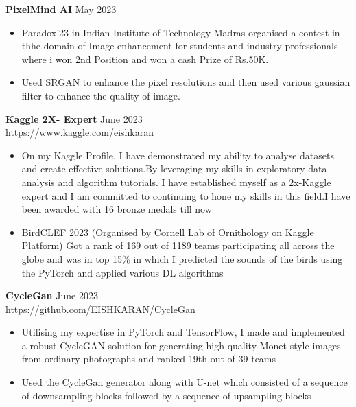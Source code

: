 \documentclass[a4paper]{article}
\begin{document}
{\textbf{PixelMind AI}} \hfill May 2023 \\
\vspace{-1.5mm}
\begin{itemize} 
	\item Paradox’23 in Indian Institute of Technology Madras organised a contest in thhe domain of Image enhancement for students and industry professionals where i won 2nd Position and won a cash Prize of Rs.50K.
    \vspace{-2mm}
    \item Used SRGAN to enhance the pixel resolutions and then used various gaussian filter to enhance the quality of image.
\end{itemize}
{\textbf{Kaggle 2X- Expert}} \hfill June 2023 \\
\vspace{-1mm}
\url{https://www.kaggle.com/eishkaran} \\
\vspace{-2mm}
\begin{itemize} 
	\item On my Kaggle Profile, I have demonstrated my ability to analyse datasets and create effective solutions.By leveraging my skills in exploratory data analysis and algorithm tutorials. I have established myself as a 2x-Kaggle expert and I am committed to continuing to hone my skills in this field.I have been awarded with 16 bronze medals till now
    \vspace{-2mm}
    \item BirdCLEF 2023 (Organised by Cornell Lab of Ornithology on Kaggle Platform) Got a rank of 169 out of 1189 teams participating all across the globe and was in top 15\%  in which I predicted the sounds of the birds using the PyTorch and applied various DL algorithms 

    
\end{itemize}
{\textbf{CycleGan }} \hfill June 2023\\
\vspace{-1mm}
\url{https://github.com/EISHKARAN/CycleGan} \\
\vspace{-2mm}
\begin{itemize} 
    \item Utilising my expertise in PyTorch and TensorFlow, I made and implemented a robust CycleGAN solution for generating high-quality Monet-style images from ordinary photographs and ranked 19th out of 39 teams
    \vspace{-2mm}
    \item Used the CycleGan generator along with U-net which consisted of a sequence of downsampling blocks followed by a sequence of upsampling blocks
\end{itemize}
\end{document}
